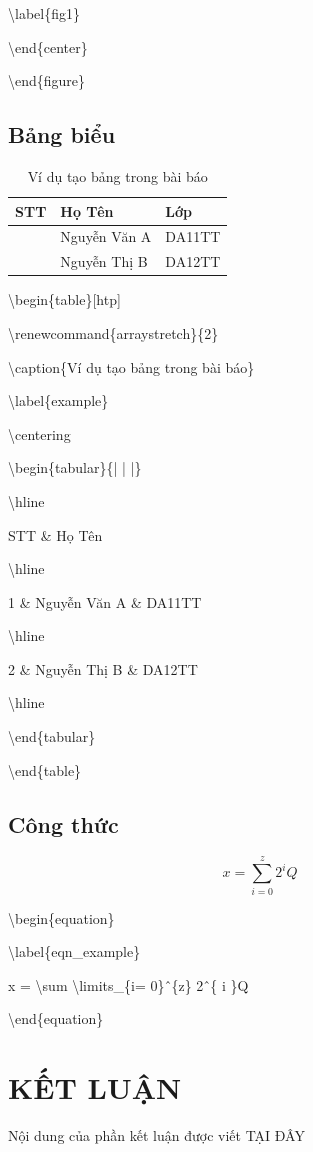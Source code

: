 \documentclass[a4paper,journal,11pt]{IEEEtran}
\begin{document}
\textbackslash label\{fig1\}

\textbackslash end\{center\}

\textbackslash end\{figure\}
\subsection{Bảng biểu}
\begin{table}[htp]
\renewcommand{\arraystretch}{2}
\caption{Ví dụ tạo bảng trong bài báo}
\label{table_example}
\centering
\begin{tabular}{|>{\centering\arraybackslash}p{1cm}|>{\centering\arraybackslash}p{3cm}|>{\centering\arraybackslash}p{2cm}|}
\hline
STT & Họ Tên & Lớp\\
\hline
1 & Nguyễn Văn A & DA11TT\\
\hline
2 & Nguyễn Thị B & DA12TT\\
\hline
\end{tabular}
\end{table}


\textbackslash begin\{table\}[htp]

\textbackslash renewcommand\{arraystretch\}\{2\}

\textbackslash caption\{Ví dụ tạo bảng trong bài báo\}

\textbackslash label\{example\}

\textbackslash centering

\textbackslash begin\{tabular\}\{| | |\}

\textbackslash hline

STT \& Họ Tên

\textbackslash hline

1 \& Nguyễn Văn A \& DA11TT

\textbackslash hline

2 \& Nguyễn Thị B \& DA12TT

\textbackslash hline

\textbackslash end\{tabular\}

\textbackslash end\{table\}

\subsection{Công thức}
\begin{equation} 
\label{eqn_example}
x = \sum \limits_{i= 0}^{z} 2^{i}Q
\end{equation}

\textbackslash begin\{equation\} 

\textbackslash label\{eqn\_example\}

x = \textbackslash sum \textbackslash limits\_\{i= 0\}\^\ \{z\} 2\^\ \{ i \}Q

\textbackslash end\{equation\}

\section{KẾT LUẬN}
Nội dung của phần kết luận được viết TẠI ĐÂY

\renewcommand\refname{\changefontsizes{10pt}TÀI LIỆU THAM KHẢO}



\end{document}

